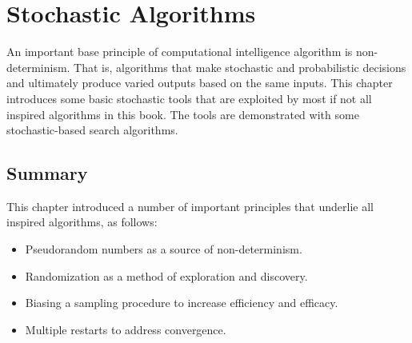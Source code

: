 \chapter{Stochastic Algorithms}
\label{ch:stochastic}

An important base principle of computational intelligence algorithm is non-determinism. That is, algorithms that make stochastic and probabilistic decisions and ultimately produce varied outputs based on the same inputs. This chapter introduces some basic stochastic tools that are exploited by most if not all inspired algorithms in this book. The tools are demonstrated with some stochastic-based search algorithms.







\section{Summary}
This chapter introduced a number of important principles that underlie all inspired algorithms, as follows:

\begin{itemize}
	\item Pseudorandom numbers as a source of non-determinism.
	\item Randomization as a method of exploration and discovery.
	\item Biasing a sampling procedure to increase efficiency and efficacy.
	\item Multiple restarts to address convergence.	
\end{itemize}

